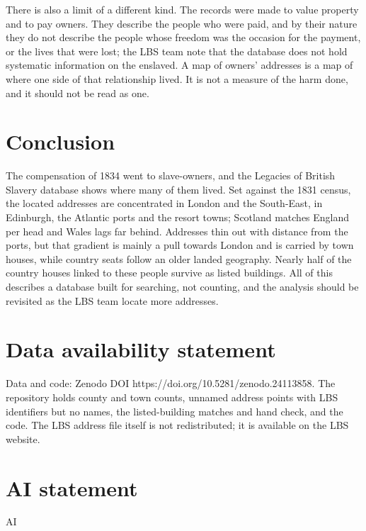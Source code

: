 \documentclass[11pt,a4paper]{article}
\begin{document}
There is also a limit of a different kind. The records were made to value property and to pay owners. They describe the people who were paid, and by their nature they do not describe the people whose freedom was the occasion for the payment, or the lives that were lost; the LBS team note that the database does not hold systematic information on the enslaved. A map of owners' addresses is a map of where one side of that relationship lived. It is not a measure of the harm done, and it should not be read as one.

\section{Conclusion}\label{sec:conc}
The compensation of 1834 went to slave-owners, and the Legacies of British Slavery database shows where many of them lived. Set against the 1831 census, the located addresses are concentrated in London and the South-East, in Edinburgh, the Atlantic ports and the resort towns; Scotland matches England per head and Wales lags far behind. Addresses thin out with distance from the ports, but that gradient is mainly a pull towards London and is carried by town houses, while country seats follow an older landed geography. Nearly half of the country houses linked to these people survive as listed buildings. All of this describes a database built for searching, not counting, and the analysis should be revisited as the LBS team locate more addresses.

\section*{Data availability statement}
Data and code: Zenodo DOI https://doi.org/10.5281/zenodo.24113858. The repository holds county and town counts, unnamed address points with LBS identifiers but no names, the listed-building matches and hand check, and the code. The LBS address file itself is not redistributed; it is available on the LBS website.

\section*{AI statement}
{{AI}}
\end{document}
